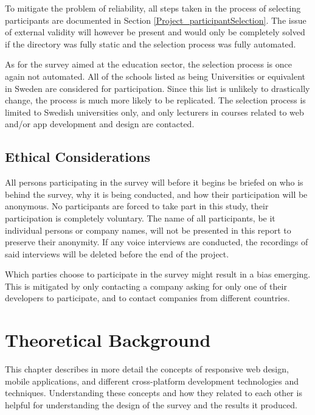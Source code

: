 \documentclass[a4paper,12pt]{article}
\begin{document}
To mitigate the problem of reliability, all steps taken in the process of selecting participants are documented in Section \ref{Project_participantSelection}. The issue of external validity will however be present and would only be completely solved if the directory was fully static and the selection process was fully automated.

As for the survey aimed at the education sector, the selection process is once again not automated. All of the schools listed as being Universities or equivalent in Sweden are considered for participation. Since this list is unlikely to drastically change, the process is much more likely to be replicated. The selection process is limited to Swedish universities only, and only lecturers in courses related to web and/or app development and design are contacted.

\subsection{Ethical Considerations}
\label{Method_ethics}
All persons participating in the survey will before it begins be briefed on who is behind the survey, why it is being conducted, and how their participation will be anonymous. No participants are forced to take part in this study, their participation is completely voluntary.
The name of all participants, be it individual persons or company names, will not be presented in this report to preserve their anonymity. If any voice interviews are conducted, the recordings of said interviews will be deleted before the end of the project.

Which parties choose to participate in the survey might result in a bias emerging. This is mitigated by only contacting a company asking for only one of their developers to participate, and to contact companies from different countries.
\newpage

\section{Theoretical Background}
\label{Theory}
This chapter describes in more detail the concepts of responsive web design, mobile applications, and different cross-platform development technologies and techniques. Understanding these concepts and how they related to each other is helpful for understanding the design of the survey and the results it produced.
\end{document}
